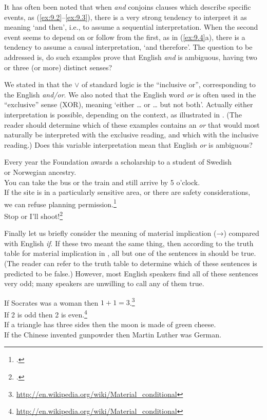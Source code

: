 It has often been noted that when \textit{and} conjoins clauses which describe specific events, as (\ref{ex:9.2}--\ref{ex:9.3}), there is a very strong tendency to interpret it as meaning ‘and then’, i.e., to assume a sequential interpretation. When the second event seems to depend on or follow from the first, as in (\ref{ex:9.4}a), there is a tendency to assume a causal interpretation, ‘and therefore’. The question to be addressed is, do such examples prove that English \textit{and} is ambiguous, having two or three (or more) distinct senses?



We stated in  that the $\vee$ of standard logic is the “inclusive or”, corresponding to the English \textit{and/or}. We also noted that the English word \textit{or} is often used in the “exclusive” sense (XOR), meaning ‘either … or … but not both’. Actually either interpretation is possible, depending on the context, as illustrated in . (The reader should determine which of these examples contains an \textit{or} that would most naturally be interpreted with the exclusive reading, and which with the inclusive reading.) Does this variable interpretation mean that English \textit{or} is ambiguous? 


\ea \label{ex:9.5}
\ea Every year the Foundation awards a scholarship to a student of Swedish\\
  or Norwegian ancestry.\\
\ex You can take the bus or the train and still arrive by 5 o’clock.\\
\ex If the site is in a particularly sensitive area, or there are safety considerations,\\
  we can refuse planning permission.\footnote{\citet[113]{Saeed2009}.}\\
\ex Stop or I’ll shoot!\footnote{\citet[113]{Saeed2009}.}
                       \z
\z


Finally let us briefly consider the meaning of material implication (→) compared with English \textit{if}. If these two meant the same thing, then according to the truth table for material implication in , all but one of the sentences in  should be true. (The reader can refer to the truth table to determine which of these sentences is predicted to be false.) However, most English speakers find all of these sentences very odd; many speakers are unwilling to call any of them true.


\ea \label{ex:9.6}
\ea If Socrates was a woman then $1+1=3$.\footnote{\url{http://en.wikipedia.org/wiki/Material_conditional}} \\
\ex If 2 is odd then 2 is even.\footnote{\url{http://en.wikipedia.org/wiki/Material_conditional}}\\
\ex If a triangle has three sides then the moon is made of green cheese.\\
\ex If the Chinese invented gunpowder then Martin Luther was German.
                       \z
\z



